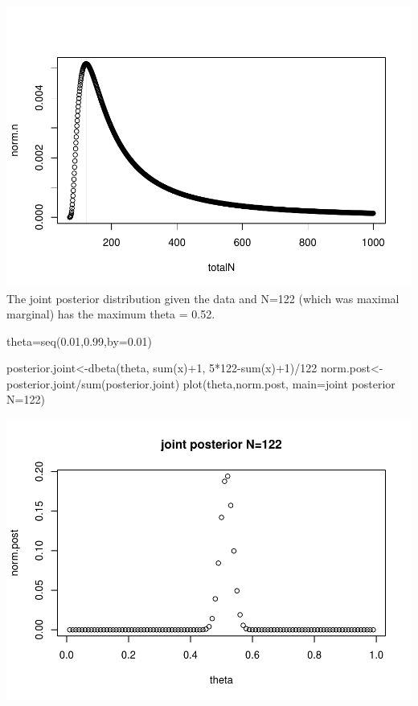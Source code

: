 \documentclass[
]{book}
\newenvironment{Shaded}{\begin{snugshade}}{\end{snugshade}}
\newcommand{\AttributeTok}[1]{\textcolor[rgb]{0.77,0.63,0.00}{#1}}
\newcommand{\DecValTok}[1]{\textcolor[rgb]{0.00,0.00,0.81}{#1}}
\newcommand{\FloatTok}[1]{\textcolor[rgb]{0.00,0.00,0.81}{#1}}
\newcommand{\FunctionTok}[1]{\textcolor[rgb]{0.00,0.00,0.00}{#1}}
\newcommand{\NormalTok}[1]{#1}
\newcommand{\OtherTok}[1]{\textcolor[rgb]{0.56,0.35,0.01}{#1}}
\newcommand{\SpecialCharTok}[1]{\textcolor[rgb]{0.00,0.00,0.00}{#1}}
\newcommand{\StringTok}[1]{\textcolor[rgb]{0.31,0.60,0.02}{#1}}
\theoremstyle{definition}
\theoremstyle{definition}
\theoremstyle{definition}
\theoremstyle{definition}
\theoremstyle{remark}
\begin{document}
\includegraphics{_main_files/figure-latex/unnamed-chunk-43-1.pdf}
The joint posterior distribution given the data and N=122 (which was maximal marginal) has the maximum theta = 0.52.

\begin{Shaded}
\begin{Highlighting}[]
\NormalTok{ theta}\OtherTok{=}\FunctionTok{seq}\NormalTok{(}\FloatTok{0.01}\NormalTok{,}\FloatTok{0.99}\NormalTok{,}\AttributeTok{by=}\FloatTok{0.01}\NormalTok{)}

\NormalTok{ posterior.joint}\OtherTok{\textless{}{-}}\FunctionTok{dbeta}\NormalTok{(theta, }\FunctionTok{sum}\NormalTok{(x)}\SpecialCharTok{+}\DecValTok{1}\NormalTok{, }\DecValTok{5}\SpecialCharTok{*}\DecValTok{122}\SpecialCharTok{{-}}\FunctionTok{sum}\NormalTok{(x)}\SpecialCharTok{+}\DecValTok{1}\NormalTok{)}\SpecialCharTok{/}\DecValTok{122}
\NormalTok{ norm.post}\OtherTok{\textless{}{-}}\NormalTok{posterior.joint}\SpecialCharTok{/}\FunctionTok{sum}\NormalTok{(posterior.joint)}
  \FunctionTok{plot}\NormalTok{(theta,norm.post, }\AttributeTok{main=}\StringTok{\textquotesingle{}joint posterior N=122\textquotesingle{}}\NormalTok{)}
\end{Highlighting}
\end{Shaded}

\includegraphics{_main_files/figure-latex/unnamed-chunk-44-1.pdf}
\end{document}

